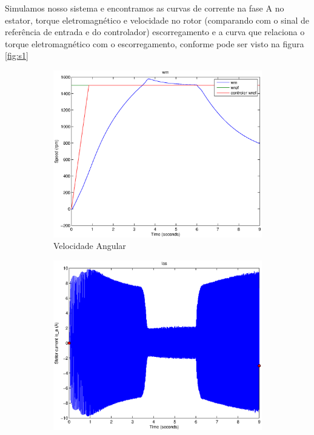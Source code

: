 \documentclass{article}
\begin{document}
Simulamos nosso sistema e encontramos as curvas de corrente na fase A no estator, torque eletromagnético e velocidade no rotor (comparando com o sinal de referência de entrada e do controlador) escorregamento e a curva que relaciona o torque eletromagnético com o escorregamento, conforme pode ser visto na figura \ref{fig:s1}
\begin{figure}[H]
	\centering
	\begin{subfigure}[b]{0.49\linewidth}
		\includegraphics[width=\linewidth]{matlab/wm}
		\caption{Velocidade Angular}
	\end{subfigure}
	\begin{subfigure}[b]{0.49\linewidth}
		\centering
		\includegraphics[width=\linewidth]{matlab/ias}

\end{subfigure}
\end{figure}
\end{document}
